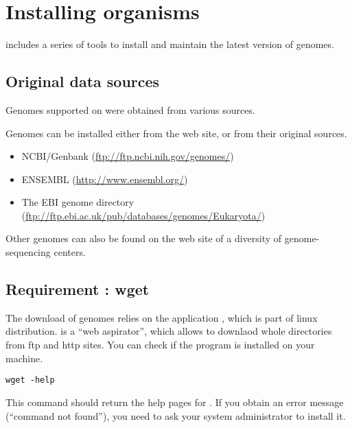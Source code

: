 
\chapter{Installing organisms}


\RSAT includes a series of tools to install and maintain the latest
version of genomes.

\section{Original data sources}

Genomes supported on \RSAT were obtained from various sources.

Genomes can be installed either from the \RSAT web site, or from their
original sources.  

\begin{itemize}
\item NCBI/Genbank (\url{ftp://ftp.ncbi.nih.gov/genomes/})

\item ENSEMBL (\url{http://www.ensembl.org/})

\item The EBI genome directory (\url{ftp://ftp.ebi.ac.uk/pub/databases/genomes/Eukaryota/})

\end{itemize}

Other genomes can also be found on the web site of a diversity of
genome-sequencing centers.

\section{Requirement : wget}

The download of genomes relies on the application ,
which is part of linux distribution.  is a ``web
aspirator'', which allows to downlaod whole directories from ftp and
http sites. You can check if the program is installed on your machine.

\begin{verbatim}
wget -help
\end{verbatim}

This command should return the help pages for .  If you
obtain an error message (``command not found''), you need to ask your
system administrator to install it.

